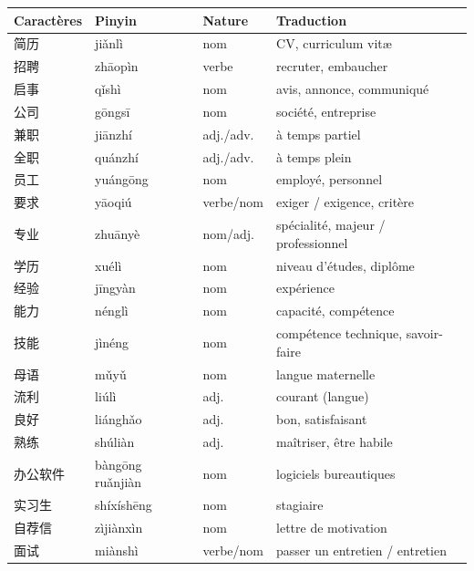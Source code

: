 \documentclass[11pt]{article}
\begin{document}
\begin{center}
\begin{tabularx}{\linewidth}{|X|X|X|X|}
\hline
\rowcolor{popblueL} \textbf{Caractères} & \textbf{Pinyin} & \textbf{Nature} & \textbf{Traduction} \\ \hline
简历 & jiǎnlì & nom & CV, curriculum vitæ \\ \hline
招聘 & zhāopìn & verbe & recruter, embaucher \\ \hline
启事 & qǐshì & nom & avis, annonce, communiqué \\ \hline
公司 & gōngsī & nom & société, entreprise \\ \hline
兼职 & jiānzhí & adj./adv. & à temps partiel \\ \hline
全职 & quánzhí & adj./adv. & à temps plein \\ \hline
员工 & yuángōng & nom & employé, personnel \\ \hline
要求 & yāoqiú & verbe/nom & exiger / exigence, critère \\ \hline
专业 & zhuānyè & nom/adj. & spécialité, majeur / professionnel \\ \hline
学历 & xuélì & nom & niveau d'études, diplôme \\ \hline
经验 & jīngyàn & nom & expérience \\ \hline
能力 & nénglì & nom & capacité, compétence \\ \hline
技能 & jìnéng & nom & compétence technique, savoir-faire \\ \hline
母语 & mǔyǔ & nom & langue maternelle \\ \hline
流利 & liúlì & adj. & courant (langue) \\ \hline
良好 & liánghǎo & adj. & bon, satisfaisant \\ \hline
熟练 & shúliàn & adj. & maîtriser, être habile \\ \hline
办公软件 & bàngōng ruǎnjiàn & nom & logiciels bureautiques \\ \hline
实习生 & shíxíshēng & nom & stagiaire \\ \hline
自荐信 & zìjiànxìn & nom & lettre de motivation \\ \hline
面试 & miànshì & verbe/nom & passer un entretien / entretien \\ \hline
\end{tabularx}
\end{center}
\end{document}
